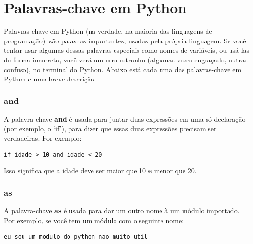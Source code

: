 
\chapter{Palavras-chave em Python}\label{app:pythonkeywords}

Palavras-chave em Python (na verdade, na maioria das linguagens de programação), são palavras importantes, usadas pela própria linguagem. Se você tentar usar algumas dessas palavras especiais como nomes de variáveis, ou usá-las de forma incorreta, você verá um erro estranho (algumas vezes engraçado, outras confuso), no terminal do Python. Abaixo está cada uma das palavras-chave em Python e uma breve descrição.

\subsection*{and}

A palavra-chave \textbf{and} é usada para juntar duas expressões em uma só declaração (por exemplo, o `if'), para dizer que essas duas expressões precisam ser verdadeiras. Por exemplo:

\begin{listingignore}
\begin{verbatim}
if idade > 10 and idade < 20
\end{verbatim}
\end{listingignore}

\noindent
Isso significa que a idade deve ser maior que 10 \textbf{e} menor que 20.

\subsection*{as}

A palavra-chave \textbf{as} é usada para dar um outro nome à um módulo importado. Por exemplo, se você tem um módulo com o seguinte nome:

\begin{listingignore}
\begin{verbatim}
eu_sou_um_modulo_do_python_nao_muito_util
\end{verbatim}
\end{listingignore}

